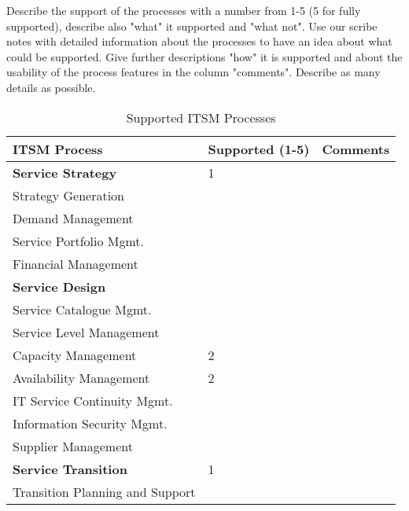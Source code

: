 Describe the support of the processes with a number from 1-5 (5 for fully supported), describe also "what" it supported and "what not". Use our scribe notes with detailed information about the processes to have an idea about what could be supported. Give further descriptions "how" it is supported and about the usability of the process features in the column "comments". Describe as many details as possible.

\begin{table}[h!]
\caption{Supported ITSM Processes}
\vspace*{0.3cm}
\begin{tabular}{|p{6.1cm}|p{4.5cm}|p{4.5cm}|}\hline
\textbf{ITSM Process}             &\textbf{Supported (1-5)}        &\textbf{Comments}\\\hline\hline
\textbf{Service Strategy}          &      1                          &\\
Strategy Generation            &                                &\\
Demand Management                   &                                &\\
Service Portfolio Mgmt.                   &                                &\\
Financial Management                   &                                &\\\hline
\textbf{Service Design}          &                                &\\
Service Catalogue Mgmt.                   &                                &\\
Service Level Management                   &                                &\\
Capacity Management                   &    2                            &\\
Availability Management                   &    2                            &\\
IT Service Continuity Mgmt.                   &                                &\\
Information Security Mgmt.                   &                                &\\
Supplier Management                   &                                &\\\hline
\textbf{Service Transition}          &      1                          &\\
Transition Planning and Support                   &                                &\\

\end{tabular}
\end{table}
